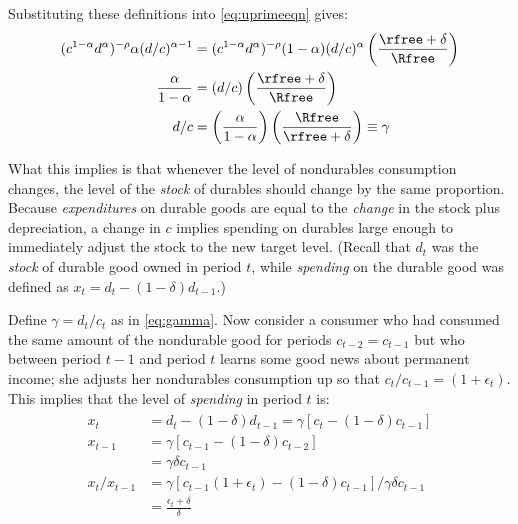 \documentclass{handout}
\begin{document}
Substituting these definitions into \eqref{eq:uprimeeqn} gives:
\begin{equation}\begin{gathered}\begin{aligned}
(c^{1-\alpha}d^{\alpha})^{-\rho} \alpha (d/c)^{\alpha-1}& = 
(c^{1-\alpha}d^{\alpha})^{-\rho}  (1-\alpha) 
(d/c)^{\alpha}\left(\frac{\rfree+\delta}{\Rfree}\right) \\
        \frac{\alpha}{1-\alpha} & =  (d/c)\left(\frac{\rfree+\delta}{\Rfree}\right)  \\
        d/c & =  \left(\frac{\alpha}{1-\alpha}\right)\left( \frac{\Rfree}{\rfree+\delta} \right)\equiv \gamma \label{eq:gamma}
\end{aligned}\end{gathered}\end{equation}

What this implies is that whenever the level of nondurables 
consumption changes, the level of the {\it stock} of durables should 
change by the same proportion.  Because {\it expenditures} on durable 
goods are equal to the {\it change} in the stock plus depreciation, a 
change in $c$ implies spending on durables large enough to immediately 
adjust the stock to the new target level.  (Recall that $d_{t}$ was 
the {\it stock} of durable good owned in period $t$, while {\it 
spending} on the durable good was defined as ${x}_{t} = d_{t} - 
(1-\delta) d_{t-1}$.)

Define $\gamma = d_{t}/c_{t}$ as in \eqref{eq:gamma}.  Now consider a
consumer who had consumed the same amount of the nondurable good for
periods $c_{t-2} = c_{t-1}$ but who between period $t-1$ and period
$t$ learns some good news about permanent income; she adjusts her
nondurables consumption up so that $c_{t}/c_{t-1} = (1+\epsilon_{t})$.
This implies that the level of {\it spending} in period $t$ is:
\begin{equation}\begin{gathered}\begin{aligned}
        {x}_{t}   & =  d_{t} - (1-\delta) d_{t-1} = \gamma [c_{t} - (1-\delta) 
        c_{t-1}]\\
        {x}_{t-1} & =  %
\gamma [c_{t-1} - (1-\delta) c_{t-2}]  \\
                & =  \gamma \delta c_{t-1}  \\
        {x}_{t}/{x}_{t-1} & =  \gamma[c_{t-1}(1+\epsilon_{t}) - 
        (1-\delta)c_{t-1}]/ \gamma \delta c_{t-1}  \\
         & =  \frac{\epsilon_{t} + \delta}{\delta} \label{eq:dursspending}
\end{aligned}\end{gathered}\end{equation}
\end{document}
